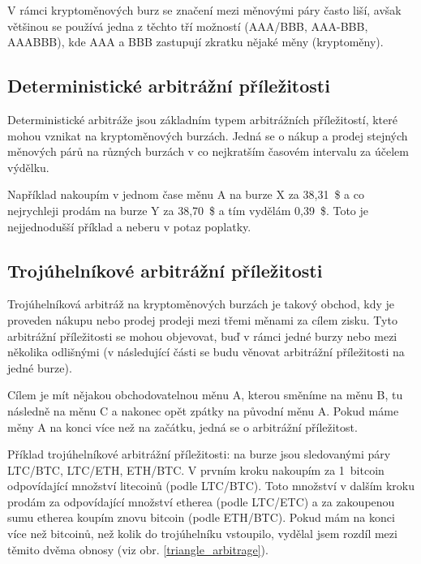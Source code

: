 \documentclass[thesis=B,czech]{FITthesis}[2019/03/21]
\begin{document}
V rámci kryptoměnových burz se značení mezi měnovými páry často liší, avšak většinou se používá jedna z těchto tří možností (AAA/BBB, AAA-BBB, AAABBB), kde AAA a BBB zastupují zkratku nějaké měny (kryptoměny).

\subsection{Deterministické arbitrážní příležitosti}
Deterministické arbitráže jsou základním typem arbitrážních příležitostí, které mohou vznikat na kryptoměnových burzách. Jedná se o nákup a prodej stejných měnových párů na různých burzách v co nejkratším časovém intervalu za účelem výdělku. \cite{CZInvestor} \cite{TowardsDataScience}

Například nakoupím v jednom čase měnu A na burze X za 38,31~\$ a co nejrychleji prodám na burze Y za 38,70~\$ a tím vydělám 0,39~\$. Toto je nejjednodušší příklad a neberu v potaz poplatky. 

\subsection{Trojúhelníkové arbitrážní příležitosti}
Trojúhelníková arbitráž na kryptoměnových burzách je takový obchod, kdy je proveden nákupu nebo prodej prodeji mezi třemi měnami za cílem zisku. Tyto arbitrážní příležitosti se mohou objevovat, buď v rámci jedné burzy nebo mezi několika odlišnými (v následující části se budu věnovat arbitrážní příležitosti na jedné burze). \cite{TradingStrategy}

Cílem je mít nějakou obchodovatelnou měnu A, kterou směníme na měnu B, tu následně na měnu C a nakonec opět zpátky na původní měnu A. Pokud máme měny A na konci více než na začátku, jedná se o arbitrážní příležitost.

Příklad trojúhelníkové arbitrážní příležitosti: na burze jsou sledovanými páry LTC/BTC, LTC/ETH, ETH/BTC. V prvním kroku nakoupím za 1~bitcoin odpovídající množství litecoinů (podle LTC/BTC). Toto množství v dalším kroku prodám za odpovídající množství etherea (podle LTC/ETC) a za zakoupenou sumu etherea koupím znovu bitcoin (podle ETH/BTC). Pokud mám na konci více než bitcoinů, než kolik do trojúhelníku vstoupilo, vydělal jsem rozdíl mezi těmito dvěma obnosy (viz obr. \ref{triangle_arbitrage}).
\end{document}

